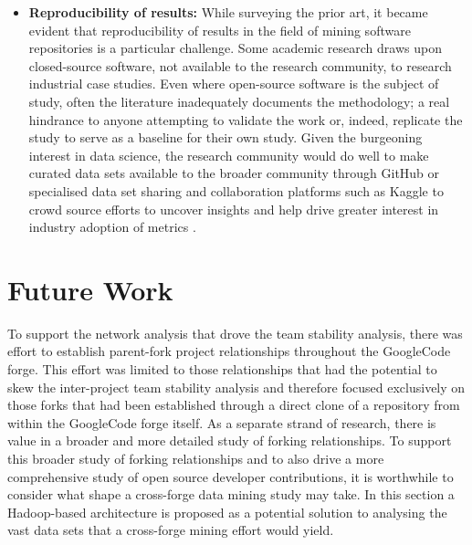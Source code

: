 \begin{itemize}
\item  \textbf{Reproducibility of results: } While surveying the prior art, it became evident that reproducibility of results in the field of mining software repositories is a particular challenge. Some academic research draws upon closed-source software, not available to the research community, to research industrial case studies. Even where open-source software is the subject of study, often the literature inadequately documents the methodology; a real hindrance to anyone attempting to validate the work or, indeed, replicate the study to serve as a baseline for their own study. Given the burgeoning interest in data science, the research community would do well to make curated data sets available to the broader community through GitHub or specialised data set sharing and collaboration platforms such as Kaggle to crowd source efforts to uncover insights and help drive greater interest in industry adoption of metrics \citep{github, kaggle}.

\end{itemize}

\section{Future Work} %
To support the network analysis that drove the team stability analysis, there was effort to establish parent-fork project relationships throughout the GoogleCode forge. This effort was limited to those relationships that had the potential to skew the inter-project team stability analysis and therefore focused exclusively on those forks that had been established through a direct clone of a repository from within the GoogleCode forge itself. As a separate strand of research, there is value in a broader and more detailed study of forking relationships.
To support this broader study of forking relationships and to also drive a more comprehensive study of open source developer contributions, it is worthwhile to consider what shape a cross-forge data mining study may take. In this section a Hadoop-based architecture is proposed as a potential solution to analysing the vast data sets that a cross-forge mining effort would yield. 

